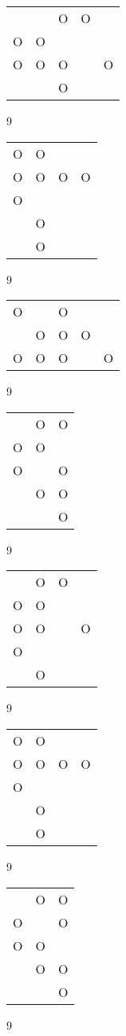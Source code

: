 \begin{tabular}{|m{0.2cm}m{0.2cm}m{0.2cm}m{0.2cm}m{0.2cm}|}\hline
 & &O&O& \\
O&O& & & \\
O&O&O& &O\\
 & &O& & \\
\hline\end{tabular}9
\begin{tabular}{|m{0.2cm}m{0.2cm}m{0.2cm}m{0.2cm}|}\hline
O&O& & \\
O&O&O&O\\
O& & & \\
 &O& & \\
 &O& & \\
\hline\end{tabular}9
\begin{tabular}{|m{0.2cm}m{0.2cm}m{0.2cm}m{0.2cm}m{0.2cm}|}\hline
O& &O& & \\
 &O&O&O& \\
O&O&O& &O\\
\hline\end{tabular}9
\begin{tabular}{|m{0.2cm}m{0.2cm}m{0.2cm}|}\hline
 &O&O\\
O&O& \\
O& &O\\
 &O&O\\
 & &O\\
\hline\end{tabular}9
\begin{tabular}{|m{0.2cm}m{0.2cm}m{0.2cm}m{0.2cm}|}\hline
 &O&O& \\
O&O& & \\
O&O& &O\\
O& & & \\
 &O& & \\
\hline\end{tabular}9
\begin{tabular}{|m{0.2cm}m{0.2cm}m{0.2cm}m{0.2cm}|}\hline
O&O& & \\
O&O&O&O\\
O& & & \\
 &O& & \\
 &O& & \\
\hline\end{tabular}9
\begin{tabular}{|m{0.2cm}m{0.2cm}m{0.2cm}|}\hline
 &O&O\\
O& &O\\
O&O& \\
 &O&O\\
 & &O\\
\hline\end{tabular}9
